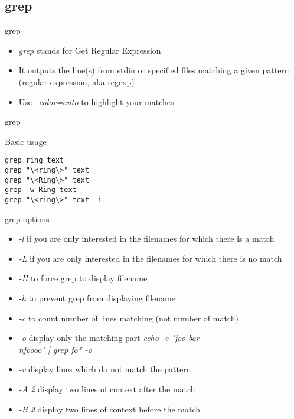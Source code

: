 \subsection{grep}
\begin{frame}[fragile]{grep}
\begin{itemize}
  \item \emph{grep} stands for Get Regular Expression
  \pause
  \item It outputs the line(s) from stdin or specified files matching a given pattern (regular expression, aka regexp)
  \pause
  \item Use \emph{--color=auto} to highlight your matches
\end{itemize}
\end{frame}

\begin{frame}[fragile]{grep}
  \begin{exampleblock}{Basic usage}
    \begin{lstlisting}[showstringspaces=false]
grep ring text
grep "\<ring\>" text
grep "\<Ring\>" text
grep -w Ring text
grep "\<ring\>" text -i
    \end{lstlisting}
  \end{exampleblock}
\end{frame}

\begin{frame}[fragile]{grep options}
\begin{itemize}
  \item \emph{-l} if you are only interested in the filenames for which there is a match
  \pause \item \emph{-L} if you are only interested in the filenames for which there is no match
  \pause \item \emph{-H} to force grep to display filename
  \pause \item \emph{-h} to prevent grep from displaying filename
  \pause \item \emph{-c} to count number of lines matching (not number of match)
  \pause \item \emph{-o} display only the matching part \emph{echo -e "foo bar\\nfoooo" | grep fo* -o}
  \pause \item \emph{-v} display lines which do not match the pattern
  \pause \item \emph{-A 2} display two lines of context after the match
  \pause \item \emph{-B 2} display two lines of context before the match
\end{itemize}
\end{frame}
